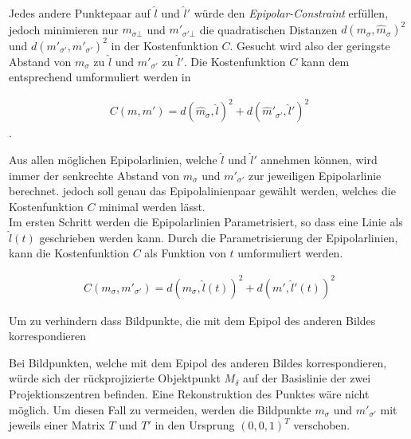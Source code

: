 Jedes andere Punktepaar auf $\hat{l}$ und $\hat{l}'$ würde den \textit{Epipolar-Constraint} erfüllen, jedoch minimieren nur $m_{\sigma\bot}$ und $m'_{\sigma' \bot}$ die quadratischen Distanzen $d(m_\sigma,\hat{m}_\sigma)^2$ und $ d(m'_{\sigma'},\hat{m}'_{\sigma'})^2$ in der Kostenfunktion $C$. Gesucht wird also der geringste Abstand von $m_\sigma$ zu $\hat{l}$ und $m'_{\sigma'}$ zu $\hat{l}'$. Die Kostenfunktion $C$ kann dem entsprechend umformuliert werden in 

\begin{gather}
	C(m,m') = d(\hat{m}_\sigma,\hat{l})^2 + d(\hat{m}'_{\sigma'},\hat{l}')^2
\end{gather}
.

Aus allen möglichen Epipolarlinien, welche $\hat{l}$ und $\hat{l}'$ annehmen können, wird immer der senkrechte Abstand von $m_\sigma$ und $m'_{\sigma'}$ zur jeweiligen Epipolarlinie berechnet. jedoch soll genau das Epipolalinienpaar gewählt werden, welches die Kostenfunktion $C$ minimal werden lässt\cite{HZ}.\\

Im ersten Schritt werden die Epipolarlinien Parametrisiert, so dass eine Linie als $\hat{l}(t)$ geschrieben werden kann. Durch die Parametrisierung der Epipolarlinien, kann die Kostenfunktion $C$ als Funktion von $t$ umformuliert werden.


\begin{gather}
	C(m_\sigma,m'_{\sigma'}) = d(m_\sigma,\hat{l}(t))^2 + d(m',\hat{l}'(t))^2
\end{gather}


%

Um zu verhindern dass Bildpunkte, die mit dem Epipol des anderen Bildes korrespondieren 

Bei Bildpunkten, welche mit dem Epipol des anderen Bildes korrespondieren, würde sich der rückprojizierte Objektpunkt $M_\delta$ auf der Basislinie der zwei Projektionszentren befinden. Eine Rekonstruktion des Punktes wäre nicht möglich\cite{HZ}. Um diesen Fall zu vermeiden, werden die Bildpunkte $m_\sigma$ und $m'_{\sigma'} $ mit jeweils einer Matrix $T$ und $T'$ in den Ursprung $(0,0,1)^T$ verschoben.

